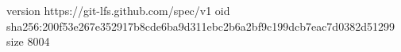 version https://git-lfs.github.com/spec/v1
oid sha256:200f53e267e352917b8cde6ba9d311ebc2b6a2bf9c199dcb7eac7d0382d51299
size 8004
